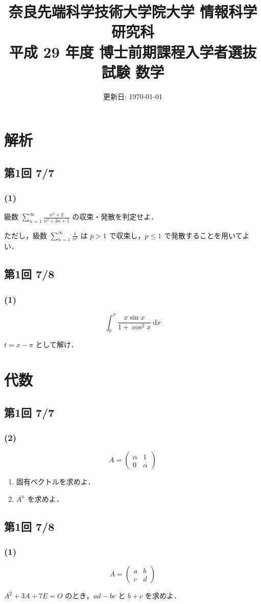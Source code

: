 \documentclass[12pt, dvipdfmx, a4paper]{jsarticle}
\title{
  奈良先端科学技術大学院大学 情報科学研究科 \\
  平成 29 年度 博士前期課程入学者選抜試験 数学
}
\date{更新日: \today}
\begin{document}
\maketitle

\section*{解析}
\subsection*{第1回 7/7}
\subsubsection*{(1)}
級数 $\displaystyle \sum_{n = 1}^\infty \frac{n^2 + 2}{n^4 + 3n + 1}$ の収束・発散を判定せよ．

ただし，級数 $\displaystyle \sum_{n = 1}^\infty \frac{1}{n^p}$ は
$p > 1$ で収束し，$p \leq 1$ で発散することを用いてよい．

\subsection*{第1回 7/8}
\subsubsection*{(1)}
\[
  \int_0^\pi \frac{x \sin x}{1 + \cos^2 x} \: \mathrm{d}x
\]

$t = x - \pi$ として解け．


\clearpage


\section*{代数}
\subsection*{第1回 7/7}
\subsubsection*{(2)}
\[
  A = \begin{pmatrix} \alpha & 1 \\ 0 & \alpha \end{pmatrix}
\]

\begin{enumerate}
  \item 固有ベクトルを求めよ．
  \item $A^n$ を求めよ．
\end{enumerate}

\subsection*{第1回 7/8}
\subsubsection*{(1)}
\[
  A = \begin{pmatrix} a & b \\ c & d \end{pmatrix}
\]

$A^2 + 3A + 7E = O$ のとき，$ad - bc$ と $b + c$ を求めよ．
\end{document}
